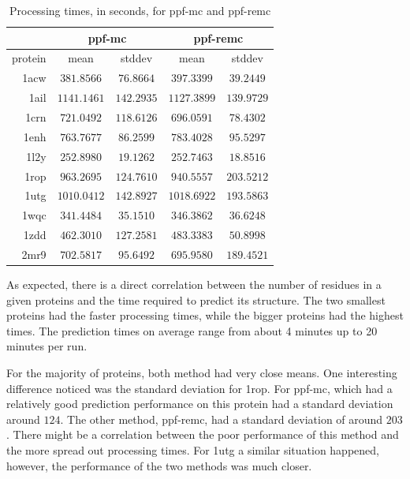 \begin{table}
  \centering
  \begin{tabular}{r|c|c||c|c}
            & \multicolumn{2}{c}{ppf-mc} & \multicolumn{2}{||c}{ppf-remc} \\ \hline
    protein & mean & stddev & mean & stddev \\ \hline \hline
    1acw & $ 381.8566$ & $ 76.8664$ & $ 397.3399$ & $ 39.2449$ \\ \hline
    1ail & $1141.1461$ & $142.2935$ & $1127.3899$ & $139.9729$ \\ \hline
    1crn & $ 721.0492$ & $118.6126$ & $ 696.0591$ & $ 78.4302$ \\ \hline
    1enh & $ 763.7677$ & $ 86.2599$ & $ 783.4028$ & $ 95.5297$ \\ \hline
    1l2y & $ 252.8980$ & $ 19.1262$ & $ 252.7463$ & $ 18.8516$ \\ \hline
    1rop & $ 963.2695$ & $124.7610$ & $ 940.5557$ & $203.5212$ \\ \hline
    1utg & $1010.0412$ & $142.8927$ & $1018.6922$ & $193.5863$ \\ \hline
    1wqc & $ 341.4484$ & $ 35.1510$ & $ 346.3862$ & $ 36.6248$ \\ \hline
    1zdd & $ 462.3010$ & $127.2581$ & $ 483.3383$ & $ 50.8998$ \\ \hline
    2mr9 & $ 702.5817$ & $ 95.6492$ & $ 695.9580$ & $189.4521$ \\ \hline
  \end{tabular}
  \caption{Processing times, in seconds, for ppf-mc and ppf-remc}
  \label{tab:processing-times}
\end{table}

As expected, there is a direct correlation between the number of residues in a
given proteins and the time required to predict its structure. The two smallest
proteins had the faster processing times, while the bigger proteins had the
highest times. The prediction times on average range from about 4 minutes up to
20 minutes per run.

For the majority of proteins, both method had very close means. One interesting
difference noticed was the standard deviation for 1rop. For ppf-mc,
which had a relatively good prediction performance on this protein had
a standard deviation around $124$. The other method, ppf-remc, had a
standard deviation of around $203$. There might be a correlation between the
poor performance of this method and the more spread out processing times.
For 1utg a similar situation happened, however, the performance of the two
methods was much closer.

